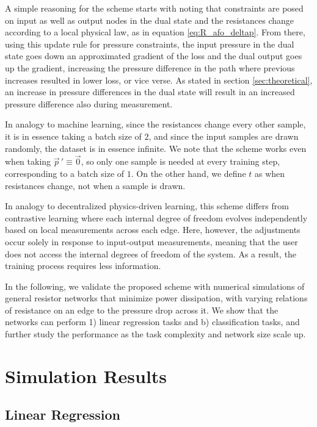 \documentclass[%
 reprint,
 amsmath,amssymb,
 aps,
]{revtex4-2}
\begin{document}
{    A simple reasoning for the scheme starts with noting that constraints are posed on input as well as output nodes in the dual state and the resistances change according to a local physical law, as in equation \ref{eq:R_afo_deltap}. 
    From there, using this update rule for pressure constraints, the input pressure in the dual state goes down an approximated gradient of the loss and the dual output goes up the gradient, increasing the pressure difference in the path where previous increases resulted in lower loss, or vice verse. 
    As stated in section \ref{sec:theoretical}, an increase in pressure differences in the dual state will result in an increased pressure difference also during measurement.
    
    In analogy to machine learning, since the resistances change every other sample, it is in essence taking a batch size of $2$, and since the input samples are drawn randomly, the dataset is in essence infinite. We note that the scheme works even when taking $\vec{p}\,'\equiv \vec{0}$, so only one sample is needed at every training step, corresponding to a batch size of $1$. On the other hand, we define $t$ as when resistances change, not when a sample is drawn.
    
    In analogy to decentralized physics-driven learning, this scheme differs from contrastive learning \cite{stern2021supervised} where each internal degree of freedom evolves independently based on local measurements across each edge. Here, however, the adjustments occur solely in response to input-output measurements, meaning that the user does not access the internal degrees of freedom of the system. As a result, the training process requires less information. 
   
    In the following, we validate the proposed scheme with numerical simulations of general resistor networks that minimize power dissipation, with varying relations of resistance on an edge to the pressure drop across it. We show that the networks can perform 1) linear regression tasks and b) classification tasks, and further study the performance as the task complexity and network size scale up.

\section{Simulation Results}\label{sec:results}

\subsection{Linear Regression}\label{sec:linear_regression}

}
\end{document}
